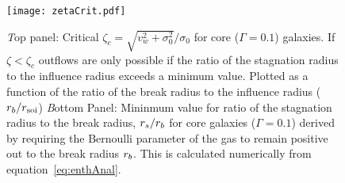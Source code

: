 \begin{figure}
\texttt{[image: zetaCrit.pdf]}
\caption{\label{fig:zetaCrit} {\emph Top panel:} Critical
  $\zeta_c=\sqrt{v_w^2+\sigma_0^2}/\sigma_0$ for core ($\Gamma=0.1$)
  galaxies. If $\zeta<\zeta_c$ outflows are only possible if the ratio
  of the stagnation radius to the influence radius exceeds a minimum
  value. Plotted as a function of the ratio of the break radius to the
  influence radius ($r_b/r_{\rm soi}$) {\emph Bottom Panel:} Mininmum value
  for ratio of the stagnation radius to the break radius, $r_s/r_b$
  for core galaxies ($\Gamma=0.1$) derived by requiring the Bernoulli
  parameter of the gas to remain positive out to the break radius
  $r_b$. This is calculated numerically from
  equation~\eqref{eq:enthAnal}.}
\end{figure}


